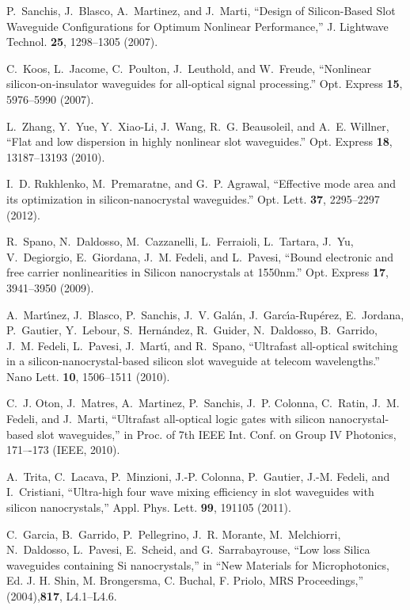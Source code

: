 \documentclass[10pt,letterpaper]{article}
\begin{document}
\begin{thebibliography}{10}
P.~Sanchis, J.~Blasco, A.~Martinez, and J.~Marti, \enquote{{Design of
  Silicon-Based Slot Waveguide Configurations for Optimum Nonlinear
  Performance},} J. Lightwave Technol. \textbf{25}, 1298--1305
  (2007).

C.~Koos, L.~Jacome, C.~Poulton, J.~Leuthold, and W.~Freude, \enquote{{Nonlinear
  silicon-on-insulator waveguides for all-optical signal processing.}} Opt. Express \textbf{15}, 5976--5990 (2007).

L.~Zhang, Y.~Yue, Y.~Xiao-Li, J.~Wang, R.~G. Beausoleil, and A.~E. Willner,
  \enquote{{Flat and low dispersion in highly nonlinear slot waveguides.}}
  Opt. Express \textbf{18}, 13187--13193 (2010).

I.~D. Rukhlenko, M.~Premaratne, and G.~P. Agrawal, \enquote{{Effective mode
  area and its optimization in silicon-nanocrystal waveguides.}} Opt. Lett.
  \textbf{37}, 2295--2297 (2012).

R.~Spano, N.~Daldosso, M.~Cazzanelli, L.~Ferraioli, L.~Tartara, J.~Yu,
  V.~Degiorgio, E.~Giordana, J.~M. Fedeli, and L.~Pavesi, \enquote{{Bound
  electronic and free carrier nonlinearities in Silicon nanocrystals at
  1550nm.}} Opt. Express \textbf{17}, 3941--3950 (2009).

A.~Mart\'{\i}nez, J.~Blasco, P.~Sanchis, J.~V. Gal\'{a}n,
  J.~Garc\'{\i}a-Rup\'{e}rez, E.~Jordana, P.~Gautier, Y.~Lebour,
  S.~Hern\'{a}ndez, R.~Guider, N.~Daldosso, B.~Garrido, J.~M. Fedeli,
  L.~Pavesi, J.~Mart\'{\i}, and R.~Spano, \enquote{{Ultrafast all-optical
  switching in a silicon-nanocrystal-based silicon slot waveguide at telecom
  wavelengths.}} Nano Lett. \textbf{10}, 1506--1511 (2010).

C.~J. Oton, J.~Matres, A.~Martinez, P.~Sanchis, J.~P. Colonna, C.~Ratin, J.~M.
  Fedeli, and J.~Marti, \enquote{{Ultrafast all-optical logic gates with
  silicon nanocrystal-based slot waveguides},} in Proc. of 7th IEEE Int. Conf. on Group IV Photonics, 171–-173 (IEEE, 2010).

A.~Trita, C.~Lacava, P.~Minzioni, J.-P. Colonna, P.~Gautier, J.-M. Fedeli, and
  I.~Cristiani, \enquote{{Ultra-high four wave mixing efficiency in slot
  waveguides with silicon nanocrystals},} Appl. Phys. Lett. \textbf{99},
  191105 (2011).

C.~Garcia, B.~Garrido, P.~Pellegrino, J.~R. Morante, M.~Melchiorri,
  N.~Daldosso, L.~Pavesi, E.~Scheid, and G.~Sarrabayrouse, \enquote{{Low loss
  Silica waveguides containing Si nanocrystals},} in \enquote{New Materials for
  Microphotonics, Ed. J. H. Shin, M. Brongersma, C. Buchal, F. Priolo, MRS
  Proceedings,}  (2004),\textbf{817}, L4.1--L4.6.


\end{thebibliography}
\end{document}
